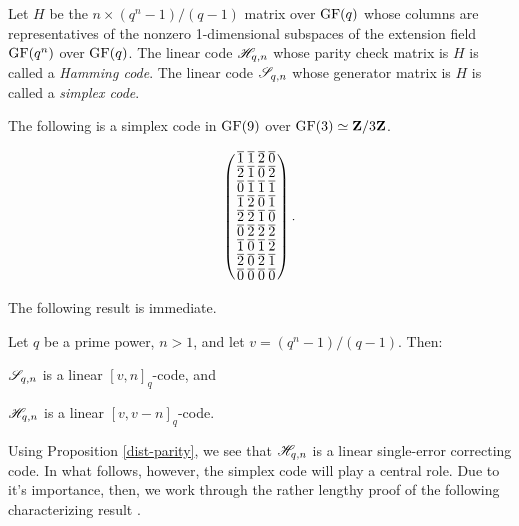 \documentclass[../../../main]{subfiles}
\begin{document}
\begin{defin}\label{hamming-code}\label{hamming-simplex-def}
 Let $H$ be the $n \times (q^n-1)/(q-1)$ matrix over $\text{GF}(q)$ whose columns are representatives of the nonzero 1-dimensional subspaces of the extension field $\text{GF}(q^n)$ over $\text{GF}(q)$. The linear code $\mathscr{H}_{q,n}$ whose parity check matrix is $H$ is called a {\it Hamming code}. The linear code $\mathscr{S}_{q,n}$ whose generator matrix is $H$ is called a {\it simplex code}.
\end{defin}

\begin{ex}
The following is a simplex code in $\text{GF}(9)$ over $\text{GF}(3) \simeq \mathbf{Z}/3\mathbf{Z}$.
\begin{small}
\begin{equation}
\arraycolsep=1.25pt\def\arraystretch{0.625}
 \left(\begin{array}{cccc}
\bar{1}&\bar{1}&\bar{2}&\bar{0}\\
\bar{2}&\bar{1}&\bar{0}&\bar{2}\\
\bar{0}&\bar{1}&\bar{1}&\bar{1}\\
\bar{1}&\bar{2}&\bar{0}&\bar{1}\\
\bar{2}&\bar{2}&\bar{1}&\bar{0}\\
\bar{0}&\bar{2}&\bar{2}&\bar{2}\\
\bar{1}&\bar{0}&\bar{1}&\bar{2}\\
\bar{2}&\bar{0}&\bar{2}&\bar{1}\\
\bar{0}&\bar{0}&\bar{0}&\bar{0}\\
 \end{array}\right).
\end{equation}
\end{small}
\end{ex}

The following result is immediate.

\begin{prop}
 Let $q$ be a prime power, $n > 1$, and let $v=(q^n-1)/(q-1)$. Then:
 \begin{defenum}
  \item $\mathscr{S}_{q,n}$ is a linear $[v,n]_q$-code, and
  \item $\mathscr{H}_{q,n}$ is a linear $[v,v-n]_q$-code.
 \end{defenum}
\end{prop}

Using Proposition \ref{dist-parity}, we see that $\mathscr{H}_{q,n}$ is a linear single-error correcting code. In what follows, however, the simplex code will play a central role. Due to it's importance, then, we work through the rather lengthy proof of the following characterizing result \cite[see][Theorem 3.9.27]{combinatorics-of-symmetric-designs}.
\end{document}
